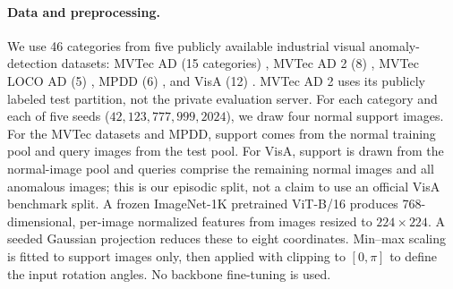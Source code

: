 \paragraph{Data and preprocessing.}
We use 46 categories from five publicly available industrial visual
anomaly-detection datasets: MVTec AD (15 categories)
\cite{mvtecAD2019}, MVTec AD 2 (8) \cite{mvtecAD22026},
MVTec LOCO AD (5) \cite{mvtecLOCO2022}, MPDD (6)
\cite{mpdd2021}, and VisA (12) \cite{visa2022}.
MVTec AD 2 uses its publicly labeled test partition, not the private
evaluation server. For each category and each of five seeds
($42,123,777,999,2024$), we draw four normal support images.
For the MVTec datasets and MPDD, support comes from the normal training
pool and query images from the test pool. For VisA, support is drawn
from the normal-image pool and queries comprise the remaining normal
images and all anomalous images; this is our episodic split, not a
claim to use an official VisA benchmark split. A frozen ImageNet-1K
pretrained ViT-B/16 produces 768-dimensional, per-image normalized
features from images resized to $224\times224$. A seeded Gaussian
projection reduces these to eight coordinates. Min--max scaling is
fitted to support images only, then applied with clipping to $[0,\pi]$
to define the input rotation angles. No backbone fine-tuning is used.

